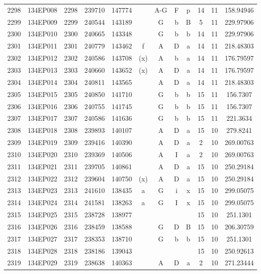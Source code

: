 \begin{tabular}{|*{12}{c|}}
2298 & 134EP008 & 2298 & 239710 & 147774 &  & A-G & F & p & 14 & 11 & 158.94946 \\ 
2299 & 134EP009 & 2299 & 240544 & 143189 &  & G & b & B & 5 & 11 & 229.97906 \\ 
2300 & 134EP010 & 2300 & 240665 & 143348 &  & G & b & b & 14 & 11 & 229.97906 \\ 
2301 & 134EP011 & 2301 & 240779 & 143462 & f & A & D & a & 14 & 11 & 218.48303 \\ 
2302 & 134EP012 & 2302 & 240586 & 143708 & (x) & A & b & a & 14 & 11 & 176.79597 \\ 
2303 & 134EP013 & 2303 & 240660 & 143652 & (x) & A & D & a & 14 & 11 & 176.79597 \\ 
2304 & 134EP014 & 2304 & 240811 & 143565 &  & A & D & a & 14 & 11 & 218.48303 \\ 
2305 & 134EP015 & 2305 & 240850 & 141710 &  & G & b & b & 15 & 11 & 156.7307 \\ 
2306 & 134EP016 & 2306 & 240755 & 141745 &  & G & b & b & 15 & 11 & 156.7307 \\ 
2307 & 134EP017 & 2307 & 240586 & 141636 &  & G & b & b & 15 & 11 & 221.3634 \\ 
2308 & 134EP018 & 2308 & 239893 & 140107 &  & A & D & a & 15 & 10 & 279.8241 \\ 
2309 & 134EP019 & 2309 & 239416 & 140390 &  & A & D & a & 2 & 10 & 269.00763 \\ 
2310 & 134EP020 & 2310 & 239369 & 140506 &  & A & I & a & 2 & 10 & 269.00763 \\ 
2311 & 134EP021 & 2311 & 239705 & 140861 &  & A & D & a & 15 & 10 & 250.29184 \\ 
2312 & 134EP022 & 2312 & 239604 & 140750 & (x) & A & D & a & 15 & 10 & 250.29184 \\ 
2313 & 134EP023 & 2313 & 241610 & 138435 & a & G & i & x & 15 & 10 & 299.05075 \\ 
2314 & 134EP024 & 2314 & 241581 & 138263 & a & G & I & x & 15 & 10 & 299.05075 \\ 
2315 & 134EP025 & 2315 & 238728 & 138977 &  &  &  &  & 15 & 10 & 251.1301 \\ 
2316 & 134EP026 & 2316 & 238459 & 138588 &  & G & D & B & 15 & 10 & 206.30759 \\ 
2317 & 134EP027 & 2317 & 238353 & 138710 &  & G & b & b & 15 & 10 & 251.1301 \\ 
2318 & 134EP028 & 2318 & 238186 & 139043 &  &  &  &  & 15 & 10 & 250.92613 \\ 
2319 & 134EP029 & 2319 & 238638 & 140363 &  & A & D & a & 2 & 10 & 271.23444 \\ 

\end{tabular}
